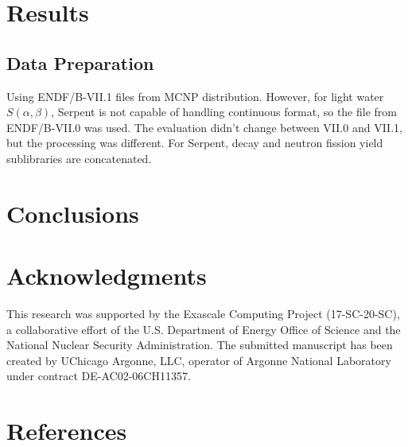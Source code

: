 \documentclass[3p,authoryear]{elsarticle}
\begin{document}
\section{Results}
\label{sec:results}

\subsection{Data Preparation}

Using ENDF/B-VII.1 files from MCNP distribution. However, for light water
$S(\alpha,\beta)$, Serpent is not capable of handling continuous format, so the
file from ENDF/B-VII.0 was used. The evaluation didn't change between VII.0 and
VII.1, but the processing was different. For Serpent, decay and neutron fission
yield sublibraries are concatenated.

\subsection{}


\section{Conclusions}
\label{sec:conclusions}

\section*{Acknowledgments}

This research was supported by the Exascale Computing Project (17-SC-20-SC), a
collaborative effort of the U.S. Department of Energy Office of Science and the
National Nuclear Security Administration. The submitted manuscript has been
created by UChicago Argonne, LLC, operator of Argonne National Laboratory under
contract DE-AC02-06CH11357.

\section*{References}



\end{document}
